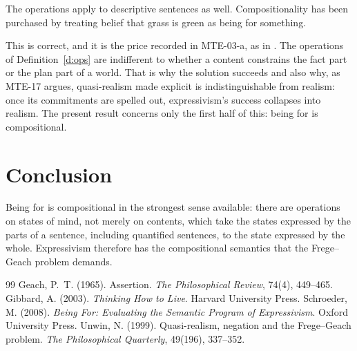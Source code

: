 \documentclass{situationist-preprint}
\begin{document}
\begin{objection}
The operations apply to descriptive sentences as well. Compositionality has been purchased by treating belief that grass is green as being for something.
\end{objection}

\begin{reply}
This is correct, and it is the price recorded in MTE-03-a, as in \citet{Schroeder2008}. The operations of Definition~\ref{d:ops} are indifferent to whether a content constrains the fact part or the plan part of a world. That is why the solution succeeds and also why, as MTE-17 argues, quasi-realism made explicit is indistinguishable from realism: once its commitments are spelled out, expressivism's success collapses into realism. The present result concerns only the first half of this: being for is compositional.
\end{reply}

\section{Conclusion}

Being for is compositional in the strongest sense available: there are operations on states of mind, not merely on contents, which take the states expressed by the parts of a sentence, including quantified sentences, to the state expressed by the whole. Expressivism therefore has the compositional semantics that the Frege--Geach problem demands.

\begin{thebibliography}{99}\small
{} Geach, P.~T. (1965). Assertion. \emph{The Philosophical Review}, 74(4), 449--465.
 Gibbard, A. (2003). \emph{Thinking How to Live}. Harvard University Press.
 Schroeder, M. (2008). \emph{Being For: Evaluating the Semantic Program of Expressivism}. Oxford University Press.
 Unwin, N. (1999). Quasi-realism, negation and the Frege--Geach problem. \emph{The Philosophical Quarterly}, 49(196), 337--352.
\end{thebibliography}
\end{document}
